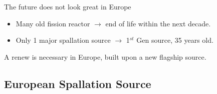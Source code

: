 \begin{frame}
\begin{columns}
\begin{column}{0.50\textwidth}
    \end{column}
  \end{columns}
  \begin{alertblock}{The future does not look great in Europe}
    \begin{itemize}
      \item Many old fission reactor $\rightarrow$ end of life within the next decade.
      \item Only 1 major spallation source $\rightarrow$ 1$^{st}$ Gen source, 35 years old.
    \end{itemize}
    A renew is necessary in Europe, built upon a new flagship source.
   \end{alertblock}
\end{frame}

\subsection{European Spallation Source}
